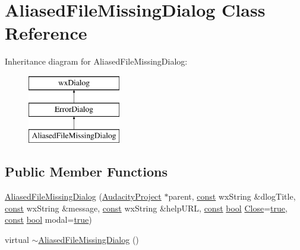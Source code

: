 \hypertarget{class_aliased_file_missing_dialog}{}\section{Aliased\+File\+Missing\+Dialog Class Reference}
\label{class_aliased_file_missing_dialog}
Inheritance diagram for Aliased\+File\+Missing\+Dialog\+:\begin{figure}[H]
\begin{center}
\leavevmode
\includegraphics[height=3.000000cm]{class_aliased_file_missing_dialog}
\end{center}
\end{figure}
\subsection*{Public Member Functions}
\begin{DoxyCompactItemize}
\item 
\hyperlink{class_aliased_file_missing_dialog_a49b66062260e6d30acce733f8dca6cff}{Aliased\+File\+Missing\+Dialog} (\hyperlink{class_audacity_project}{Audacity\+Project} $\ast$parent, \hyperlink{getopt1_8c_a2c212835823e3c54a8ab6d95c652660e}{const} wx\+String \&dlog\+Title, \hyperlink{getopt1_8c_a2c212835823e3c54a8ab6d95c652660e}{const} wx\+String \&message, \hyperlink{getopt1_8c_a2c212835823e3c54a8ab6d95c652660e}{const} wx\+String \&help\+U\+RL, \hyperlink{getopt1_8c_a2c212835823e3c54a8ab6d95c652660e}{const} \hyperlink{mac_2config_2i386_2lib-src_2libsoxr_2soxr-config_8h_abb452686968e48b67397da5f97445f5b}{bool} \hyperlink{portburn__winxp_8cpp_ad6f32ac62ea277a3e8a068ed1faeee1f}{Close}=\hyperlink{mac_2config_2i386_2lib-src_2libsoxr_2soxr-config_8h_a41f9c5fb8b08eb5dc3edce4dcb37fee7}{true}, \hyperlink{getopt1_8c_a2c212835823e3c54a8ab6d95c652660e}{const} \hyperlink{mac_2config_2i386_2lib-src_2libsoxr_2soxr-config_8h_abb452686968e48b67397da5f97445f5b}{bool} modal=\hyperlink{mac_2config_2i386_2lib-src_2libsoxr_2soxr-config_8h_a41f9c5fb8b08eb5dc3edce4dcb37fee7}{true})
\item 
virtual \hyperlink{class_aliased_file_missing_dialog_a7c92d8d8b9f7e8498fb0bcb5cf8524f2}{$\sim$\+Aliased\+File\+Missing\+Dialog} ()
\end{DoxyCompactItemize}



